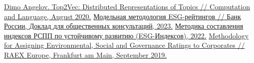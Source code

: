 \documentclass[a4paper, 14pt]{extarticle}
\begin{document}
\begin{thebibliography}{}
      \href{https://arxiv.org/abs/2008.09470}{Dimo Angelov. Top2Vec: Distributed Representations of Topics // Computation and Language, August 2020.}
     \href{http://www.cbr.ru/Content/Document/File/144085/Consultation_Paper_17012023.pdf}{Модельная методология ESG-рейтингов // Банк России, Доклад для
общественных консультаций, 2023.}
      \href{https://rspp.ru/upload/content/909/1oii9yidubx9wteo5jemy7f89925nd5j/Metodika_2022.pdf}{Методика составления индексов РСПП по устойчивому развитию (ESG-Индексов), 2022.}
     \href{https://www.raexpert.eu/files/Methodology_ESG_Corporates_V3.pdf}{Methodology for Assigning Environmental, Social and Governance Ratings to
Corporates // RAEX Europe, Frankfurt am Main, September 2019.}
\end{thebibliography}

\end{document}
